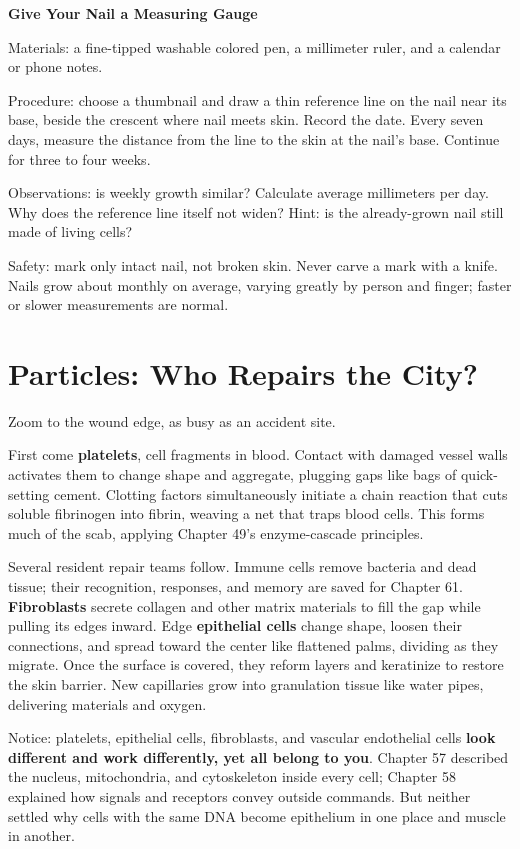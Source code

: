 \begin{shiyan}
\textbf{Give Your Nail a Measuring Gauge}

Materials: a fine-tipped washable colored pen, a millimeter ruler, and a calendar or phone notes.

Procedure: choose a thumbnail and draw a thin reference line on the nail near its base, beside the crescent where nail meets skin. Record the date. Every seven days, measure the distance from the line to the skin at the nail's base. Continue for three to four weeks.

Observations: is weekly growth similar? Calculate average millimeters per day. Why does the reference line itself not widen? Hint: is the already-grown nail still made of living cells?

Safety: mark only intact nail, not broken skin. Never carve a mark with a knife. Nails grow about  monthly on average, varying greatly by person and finger; faster or slower measurements are normal.
\end{shiyan}

\section{Particles: Who Repairs the City?}

Zoom to the wound edge, as busy as an accident site.

First come \textbf{platelets}, cell fragments in blood. Contact with damaged vessel walls activates them to change shape and aggregate, plugging gaps like bags of quick-setting cement. Clotting factors simultaneously initiate a chain reaction that cuts soluble fibrinogen into fibrin, weaving a net that traps blood cells. This forms much of the scab, applying Chapter 49's enzyme-cascade principles.

Several resident repair teams follow. Immune cells remove bacteria and dead tissue; their recognition, responses, and memory are saved for Chapter 61. \textbf{Fibroblasts} secrete collagen and other matrix materials to fill the gap while pulling its edges inward. Edge \textbf{epithelial cells} change shape, loosen their connections, and spread toward the center like flattened palms, dividing as they migrate. Once the surface is covered, they reform layers and keratinize to restore the skin barrier. New capillaries grow into granulation tissue like water pipes, delivering materials and oxygen.

Notice: platelets, epithelial cells, fibroblasts, and vascular endothelial cells \textbf{look different and work differently, yet all belong to you}. Chapter 57 described the nucleus, mitochondria, and cytoskeleton inside every cell; Chapter 58 explained how signals and receptors convey outside commands. But neither settled why cells with the same DNA become epithelium in one place and muscle in another.

